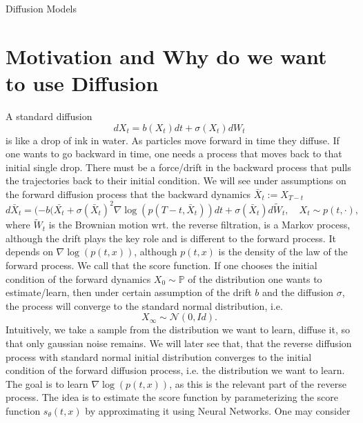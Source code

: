 \documentclass[a4paper,12pt,twoside]{article}
\begin{document}
\begin{center}
    \huge{ Diffusion Models }
\end{center}
\begin{abstract}
    Sections 4, 5 and 6 are from \cite{karatzas1991brownian}. Specifically, these sections are based on Sections 5.3 and 5.4. Section 7 is based on the lecture Markov Processes by Prof. Slowik. Sections 8 and 9 are based on \cite{revuz1999continuous}. Here Section 7.4 and Chapter 9 were used. Section 10 is based on Chapter 5 and section 7.1 of \cite{evans2010partial}. The goal is to first derive all technical backround needed to understand \cite{haussmann1986time}. This paper is discussed in the final section.
\end{abstract}
\tableofcontents
\newpage


\section{Motivation and Why do we want to use Diffusion}
A standard diffusion 
\[
dX_t =b(X_t) dt + \sigma(X_t) dW_t
\]
is like a drop of ink in water. As particles move forward in time they diffuse. If one wants to go backward in time, one needs a process that moves back to that initial single drop. There must be a force/drift in the backward process that pulls the trajectories back to their initial condition. We will see under assumptions on the forward diffusion process that the backward dynamics $\bar{X}_t := X_{T-t}$
\[
d\bar{X}_t = (-b(\bar{X_t}+ \sigma(\bar{X}_t)^2 \nabla \log(p(T-t,\bar{X}_t) ) dt + \sigma(\bar{X}_t) d \tilde{W}_{t}, \quad X_t \sim p(t,\cdot), 
\]
where $\tilde{W}_t$ is the Brownian motion wrt. the reverse filtration, is a Markov process, although the drift plays the key role and is different to the forward process. It depends on $\nabla \log(p(t,x))$, although $p(t,x)$ is the density of the law of the forward process. We call that the score function. If one chooses the initial condition of the forward dynamics $X_0 \sim \mathbb{P}$ of the distribution one wants to estimate/learn, then under certain assumption of the drift $b$ and the diffusion $\sigma$, the process will converge to the standard normal distribution, i.e. 
\[
X_\infty \sim \mathcal{N}(0,Id).
\]
Intuitively, we take a sample from the distribution we want to learn, diffuse it, so that only gaussian noise remains. We will later see that, that the reverse diffusion process with standard normal initial distribution converges to the initial condition of the forward diffusion process, i.e. the distribution we want to learn. The goal is to learn $\nabla \log(p(t,x))$, as this is the relevant part of the reverse process. The idea is to estimate the score function by parameterizing the score function $s_\theta (t,x)$ by approximating it using Neural Networks. One may consider 
\end{document}

